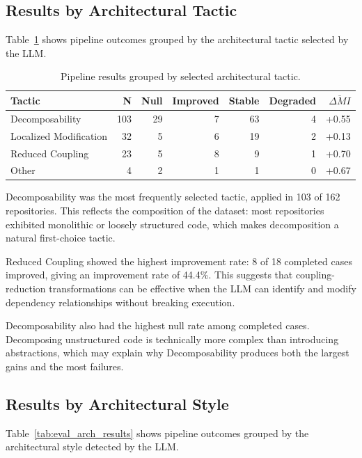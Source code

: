 \subsection{Results by Architectural Tactic}
\label{subsec:eval_tactic_results}

Table~\ref{tab:eval_tactics} shows pipeline outcomes grouped by the architectural tactic selected by the LLM.

\begin{table}[H]
\centering
\small
\caption{Pipeline results grouped by selected architectural tactic.}
\label{tab:eval_tactics}
\begin{tabular}{lrrrrrr}
\toprule
\textbf{Tactic} & \textbf{N} & \textbf{Null} & \textbf{Improved} & \textbf{Stable} & \textbf{Degraded} & $\overline{\Delta MI}$ \\
\midrule
Decomposability & 103 & 29 & 7 & 63 & 4 & +0.55 \\
Localized Modification & 32 & 5 & 6 & 19 & 2 & +0.13 \\
Reduced Coupling & 23 & 5 & 8 & 9 & 1 & +0.70 \\
Other & 4 & 2 & 1 & 1 & 0 & +0.67 \\
\bottomrule
\end{tabular}
\end{table}

Decomposability was the most frequently selected tactic, applied in 103 of 162 repositories. This reflects the composition of the dataset: most repositories exhibited monolithic or loosely structured code, which makes decomposition a natural first-choice tactic.

Reduced Coupling showed the highest improvement rate: 8 of 18 completed cases improved, giving an improvement rate of 44.4\%. This suggests that coupling-reduction transformations can be effective when the LLM can identify and modify dependency relationships without breaking execution.

Decomposability also had the highest null rate among completed cases. Decomposing unstructured code is technically more complex than introducing abstractions, which may explain why Decomposability produces both the largest gains and the most failures.

\subsection{Results by Architectural Style}
\label{subsec:eval_arch_results}

Table~\ref{tab:eval_arch_results} shows pipeline outcomes grouped by the architectural style detected by the LLM.


